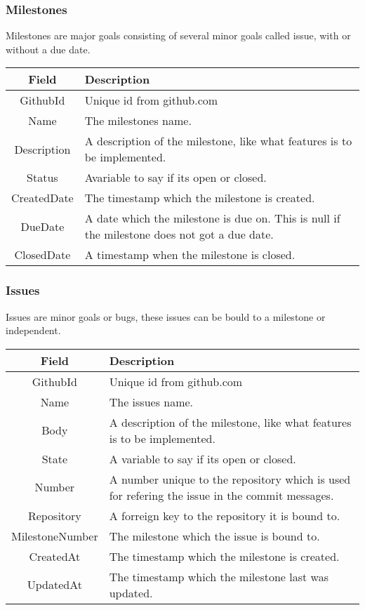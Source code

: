 \subsubsection*{Milestones}
Milestones are major goals consisting of several minor goals called issue, with or without a due date. \\

\vspace{0.5cm}
\begin{tabularx}{\linewidth}{| c | X |}
    \hline
    \rowcolor[gray]{0.8}
    \textbf{Field} & \textbf{Description} \\
    \hline
    GithubId & Unique id from github.com\\ \hline
    Name & The milestones name.\\ \hline
   	Description & A description of the milestone, like what features is to be implemented.\\ \hline
    Status & Avariable to say if its open or closed.\\ \hline
    CreatedDate & The timestamp which the milestone is created.\\ \hline
    DueDate & A date which the milestone is due on. This is null if the milestone does not got a due date.\\ \hline
    ClosedDate & A timestamp when the milestone is closed.\\ 
    \hline
\end{tabularx}
\vspace{0.5cm}

\subsubsection*{Issues}
Issues are minor goals or bugs, these issues can be bould to a milestone or independent. \\

\vspace{0.5cm}
\begin{tabularx}{\linewidth}{| c | X |}
    \hline
    \rowcolor[gray]{0.8}
    \textbf{Field} & \textbf{Description} \\
    \hline
    GithubId & Unique id from github.com\\ \hline
    Name & The issues name.\\ \hline
   	Body & A description of the milestone, like what features is to be implemented.\\ \hline
    State & A variable to say if its open or closed.\\ \hline
    Number & A number unique to the repository which is used for refering the issue in the commit messages.\\ \hline
    Repository & A forreign key to the repository it is bound to.\\ \hline
    MilestoneNumber & The milestone which the issue is bound to.\\ \hline
    CreatedAt & The timestamp which the milestone is created.\\ \hline
    UpdatedAt & The timestamp which the milestone last was updated.\\ 
    \hline
\end{tabularx}
\vspace{0.5cm}

